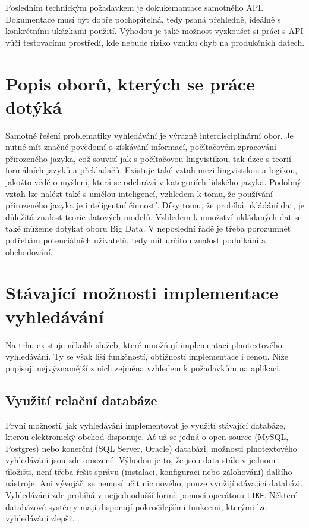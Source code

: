 \documentclass[FM,DP]{tulthesis}
\begin{document}
Posledním technickým požadavkem je dokukemantace samotného API. Dokumentace musí být
dobře pochopitelná, tedy psaná přehledně, ideálně s konkrétními ukázkami použití.
Výhodou je také možnost vyzkoušet si práci s API vůči testovacímu prostředí, 
kde nebude riziko vzniku chyb na produkčních datech.

\section{Popis oborů, kterých se práce dotýká}

Samotné řešení problematiky vyhledávání je výrazně interdisciplinární obor. Je nutné
mít značné povědomí o získávání informací, počítačovém zpracování přirozeného jazyka, 
což souvisí jak s počítačovou lingvistikou, tak úzce s teorií formálních jazyků a překladačů.
Existuje také vztah mezi lingvistikou a logikou, jakožto vědě o myšlení, která se odehrává 
v kategoriích lidského jazyka. Podobný vztah lze nalézt také s umělou inteligencí, 
vzhledem k tomu, že používání přirozeného jazyka je inteligentní činností.
Díky tomu, že probíhá ukládání dat, je důležitá znalost teorie datových modelů.
Vzhledem k množství ukládaných dat se také můžeme dotýkat oboru Big Data.
V neposlední řadě je třeba porozumnět potřebám potenciálních uživatelů, tedy mít
určitou znalost podnikání a obchodování.

\section{Stávající možnosti implementace vyhledávání}

Na trhu existuje několik služeb, které umožňují implementaci plnotextového vyhledávání.
Ty se však liší funkčností, obtížností implementace i cenou. Níže popisuji nejvýznamější 
z nich zejména vzhledem k požadavkům na aplikaci.

\subsection*{Využití relační databáze}

První možností, jak vyhledávání implementovat je využití stávající databáze, 
kterou elektronický obchod disponuje. Ať už se jedná o open source (MySQL, Postgres)
nebo konerční (SQL Server, Oracle) databázi, možnosti plnotextového vyhledávání
jsou zde omezené. Výhodou je to, že jsou data stále v jednom úložišti, není třeba
řešit správu (instalaci, konfiguraci nebo zálohování) dalšího nástroje. Ani vývojáři 
se nemusí učit nic nového, pouze využijí stávající databázi. Vyhledávání zde probíhá
v nejjednodušší formě pomocí operátoru \verb|LIKE|. Některé databázové systémy
mají disponují pokročilejšími funkcemi, kterými lze vyhledávání zlepšit \cite{postgres}.
\end{document}
